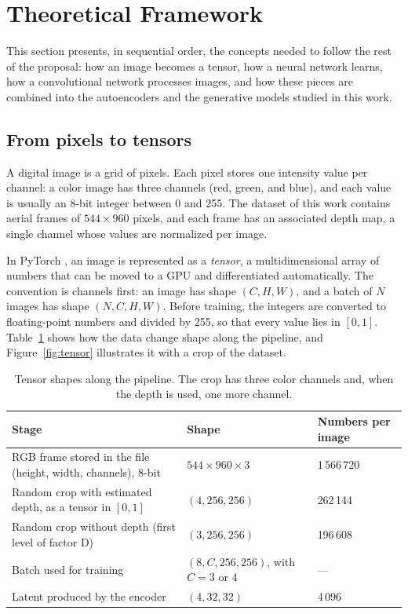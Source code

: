 \section{Theoretical Framework}

This section presents, in sequential order, the concepts needed to follow the rest of the proposal: how an image becomes a tensor, how a neural network learns, how a convolutional network processes images, and how these pieces are combined into the autoencoders and the generative models studied in this work.

\subsection{From pixels to tensors}

A digital image is a grid of pixels. Each pixel stores one intensity value per channel: a color image has three channels (red, green, and blue), and each value is usually an 8-bit integer between 0 and 255. The dataset of this work contains aerial frames of $544\times960$ pixels, and each frame has an associated depth map, a single channel whose values are normalized per image.

In PyTorch \cite{Paszke2019}, an image is represented as a \emph{tensor}, a multidimensional array of numbers that can be moved to a GPU and differentiated automatically. The convention is channels first: an image has shape $(C,H,W)$, and a batch of $N$ images has shape $(N,C,H,W)$. Before training, the integers are converted to floating-point numbers and divided by 255, so that every value lies in $[0,1]$. Table~\ref{tab:shapes} shows how the data change shape along the pipeline, and Figure~\ref{fig:tensor} illustrates it with a crop of the dataset.

\begin{table}[H]
\centering
\small
\begin{tabular}{p{}p{}p{}}
\hline
\textbf{Stage} & \textbf{Shape} & \textbf{Numbers per image} \\
\hline
RGB frame stored in the file (height, width, channels), 8-bit & $544\times960\times3$ & 1\,566\,720 \\
Random crop with estimated depth, as a tensor in $[0,1]$ & $(4,256,256)$ & 262\,144 \\
Random crop without depth (first level of factor D) & $(3,256,256)$ & 196\,608 \\
Batch used for training & $(8,C,256,256)$, with $C=3$ or $4$ & --- \\
Latent produced by the encoder & $(4,32,32)$ & 4\,096 \\
\hline
\end{tabular}
\caption{Tensor shapes along the pipeline. The crop has three color channels and, when the depth is used, one more channel.}
\label{tab:shapes}
\end{table}

